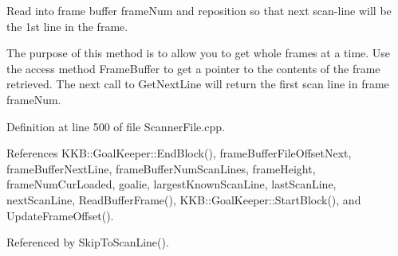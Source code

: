 Read into frame buffer \textquotesingle{}frame\+Num\textquotesingle{} and reposition so that next scan-\/line will be the 1st line in the frame. 

The purpose of this method is to allow you to get whole frames at a time. Use the access method \textquotesingle{}Frame\+Buffer\textquotesingle{} to get a pointer to the contents of the frame retrieved. The next call to \textquotesingle{}Get\+Next\+Line\textquotesingle{} will return the first scan line in frame \textquotesingle{}frame\+Num\textquotesingle{}. 

Definition at line 500 of file Scanner\+File.\+cpp.



References K\+K\+B\+::\+Goal\+Keeper\+::\+End\+Block(), frame\+Buffer\+File\+Offset\+Next, frame\+Buffer\+Next\+Line, frame\+Buffer\+Num\+Scan\+Lines, frame\+Height, frame\+Num\+Cur\+Loaded, goalie, largest\+Known\+Scan\+Line, last\+Scan\+Line, next\+Scan\+Line, Read\+Buffer\+Frame(), K\+K\+B\+::\+Goal\+Keeper\+::\+Start\+Block(), and Update\+Frame\+Offset().



Referenced by Skip\+To\+Scan\+Line().


